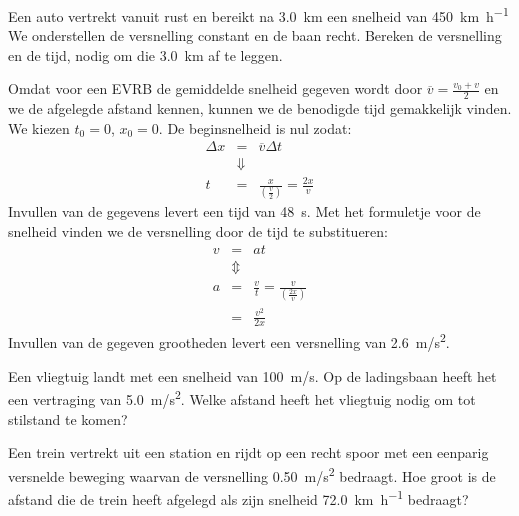 \documentclass{ximera}
\begin{document}
\begin{exercise}
    Een auto vertrekt vanuit rust en bereikt na \SI{3,0}{km} een snelheid van \SI{450}{\kilo\meter\per\hour} We onderstellen de versnelling constant en de baan recht. Bereken de versnelling en de tijd, nodig om die \SI{3,0}{km} af te leggen.
    \begin{oplossing}
    Omdat voor een EVRB de gemiddelde snelheid gegeven wordt door $\overline{v}=\frac{v_0+v}{2}$ en we de afgelegde afstand kennen, kunnen we de benodigde tijd gemakkelijk vinden. We kiezen $t_0=0$, $x_0=0$. De beginsnelheid is nul zodat:
    \begin{eqnarray*}
    \Delta x &=& \overline{v}\Delta t \\
    &\Downarrow & \\
    t &=& \frac{x}{\left(\frac{v}{2}\right)} = \frac{2x}{v}
    \end{eqnarray*}
    Invullen van de gegevens levert een tijd van \SI{48}{s}. Met het formuletje voor de snelheid vinden we de versnelling door de tijd te substitueren:
    \begin{eqnarray*}
    v &=& at \\
    &\Updownarrow&\\
    a &=& \frac{v}{t}=\frac{v}{\left(\frac{2x}{v}\right)}\\
    &=& \frac{v^2}{2x}
    \end{eqnarray*}
    Invullen van de gegeven grootheden levert een versnelling van \SI{2,6}{m/s^2}.
    \end{oplossing}
\end{exercise}

\begin{exercise}
    Een vliegtuig landt met een snelheid van \SI{100}{m/s}. Op de ladingsbaan heeft het een vertraging van \SI{5,0}{m/s^2}. Welke afstand heeft het vliegtuig nodig om tot stilstand te komen?
\end{exercise}

\begin{exercise}
    Een trein vertrekt uit een station en rijdt op een recht spoor met een eenparig versnelde beweging waarvan de versnelling \SI{0,50}{m/s^2} bedraagt. 
    Hoe groot is de afstand die de trein heeft afgelegd als zijn snelheid \SI{72,0}{\kilo\meter\per\hour} bedraagt?
\end{exercise}
\end{document}
